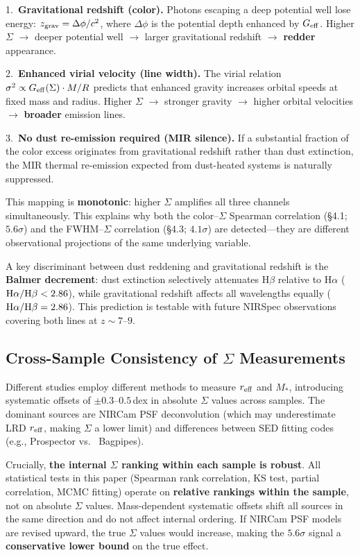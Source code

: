 \documentclass[apj,twocolumn,longbibliography,linenumbers]{aastex701}
\begin{document}
1.~\textbf{Gravitational redshift (color).} Photons escaping a deep potential well lose energy: $z_{\rm grav} = \Delta\phi/c^2$, where $\Delta\phi$ is the potential depth enhanced by $G_{\rm eff}$. Higher $\Sigma$ $\to$ deeper potential well $\to$ larger gravitational redshift $\to$ \textbf{redder} appearance.

2.~\textbf{Enhanced virial velocity (line width).} The virial relation $\sigma^2 \propto G_{\rm eff}(\Sigma) \cdot M / R$ predicts that enhanced gravity increases orbital speeds at fixed mass and radius. Higher $\Sigma$ $\to$ stronger gravity $\to$ higher orbital velocities $\to$ \textbf{broader} emission lines.

3.~\textbf{No dust re-emission required (MIR silence).} If a substantial fraction of the color excess originates from gravitational redshift rather than dust extinction, the MIR thermal re-emission expected from dust-heated systems is naturally suppressed.

This mapping is \textbf{monotonic}: higher $\Sigma$ amplifies all three channels simultaneously. This explains why both the color--$\Sigma$ Spearman correlation (\S4.1; $5.6\sigma$) and the FWHM--$\Sigma$ correlation (\S4.3; $4.1\sigma$) are detected---they are different observational projections of the same underlying variable.

A key discriminant between dust reddening and gravitational redshift is the \textbf{Balmer decrement}: dust extinction selectively attenuates H$\beta$ relative to H$\alpha$ (${\rm H}\alpha/{\rm H}\beta < 2.86$), while gravitational redshift affects all wavelengths equally (${\rm H}\alpha/{\rm H}\beta = 2.86$). This prediction is testable with future NIRSpec observations covering both lines at $z \sim 7$--$9$.

\subsection{Cross-Sample Consistency of $\Sigma$ Measurements}

Different studies employ different methods to measure $r_{\rm eff}$ and $M_*$, introducing systematic offsets of ${\pm}0.3$--$0.5$\,dex in absolute $\Sigma$ values across samples. The dominant sources are NIRCam PSF deconvolution (which may underestimate LRD $r_{\rm eff}$, making $\Sigma$ a lower limit) and differences between SED fitting codes (e.g., \citealt{Leja2019} Prospector vs.\ \citealt{Carnall2018} Bagpipes).

Crucially, \textbf{the internal $\Sigma$ ranking within each sample is robust}. All statistical tests in this paper (Spearman rank correlation, KS test, partial correlation, MCMC fitting) operate on \textbf{relative rankings within the sample}, not on absolute $\Sigma$ values. Mass-dependent systematic offsets shift all sources in the same direction and do not affect internal ordering. If NIRCam PSF models are revised upward, the true $\Sigma$ values would increase, making the $5.6\sigma$ signal a \textbf{conservative lower bound} on the true effect.
\end{document}

